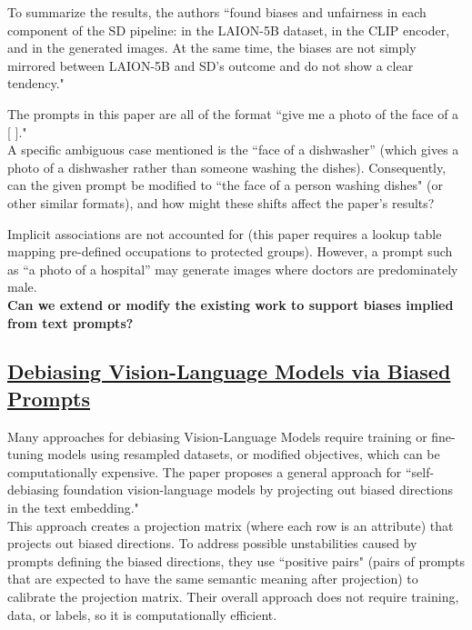 \documentclass[12pt]{amsart}
\begin{document}
To summarize the results, the authors ``found biases and unfairness in each component of the SD pipeline: in the LAION-5B dataset, in the CLIP encoder, and in the generated images. At the same time, the biases are not simply mirrored between LAION-5B and SD’s outcome and do not show a clear tendency."

\begin{discussion*}
The prompts in this paper are all of the format ``give me a photo of the face of a [ ]." \\

A specific ambiguous case mentioned is the ``face of a dishwasher” (which gives a photo of a dishwasher rather than someone washing the dishes). Consequently, can the given prompt be modified to ``the face of a person washing dishes" (or other similar formats), and how might these shifts affect the paper's results?
\end{discussion*}

\begin{extension*}
Implicit associations are not accounted for (this paper requires a lookup table mapping pre-defined occupations to protected groups). However, a prompt such as “a photo of a hospital” may generate images where doctors are predominately male. \\

\noindent \textbf{Can we extend or modify the existing work to support biases implied from text prompts?} 
\end{extension*}

\newpage

\subsection{\href{https://arxiv.org/pdf/2302.00070.pdf}{Debiasing Vision-Language Models via Biased Prompts}}\label{embedding}

\begin{approach*}
Many approaches for debiasing Vision-Language Models require training or fine-tuning models using resampled datasets, or modified objectives, which can be computationally expensive. The paper proposes a general approach for ``self-debiasing foundation vision-language models by projecting out biased directions in the text embedding." \\

This approach creates a projection matrix (where each row is an attribute) that projects out biased directions. To address possible unstabilities caused by prompts defining the biased directions, they use ``positive pairs" (pairs of prompts that are expected to have the same semantic meaning after projection) to calibrate the projection matrix. Their overall approach does not require training, data, or labels, so it is computationally efficient.
\end{approach*}
\end{document}
